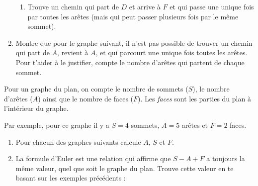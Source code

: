 \documentclass[class=report,crop=false, 12pt]{standalone}
\begin{document}
\begin{activite}
\begin{enumerate}
\begin{enumerate}
    \item Trouve un chemin qui part de $D$ et arrive à $F$ et qui passe une unique fois par toutes les arêtes (mais qui peut passer plusieurs fois par le même sommet).  
  \end{enumerate} 
  

 
 
  \item Montre que pour le graphe suivant, il n'est pas possible de trouver un chemin qui part de $A$, revient à $A$, et qui parcourt une unique fois toutes les arêtes. Pour t'aider à le justifier, compte le nombre d'arêtes qui partent de chaque sommet.


\end{enumerate}
      
   
\end{activite}


\begin{activite}
Pour un graphe du plan, on compte le nombre de sommets ($S$), le nombre d'arêtes ($A$) ainsi que le nombre de faces ($F$). Les \emph{faces} sont les parties du plan à l'intérieur du graphe.

Par exemple, pour ce graphe il y a $S=4$ sommets, $A=5$ arêtes et $F=2$ faces.


    

 
\begin{enumerate}
  \item	Pour chacun des graphes suivants calcule $A$, $S$ et $F$.
      
  
  \item La formule d'Euler est une relation qui affirme que $S-A+F$ a toujours la même valeur, quel que soit le graphe du plan. Trouve cette valeur en te basant sur les exemples précédents :
  
 {\large 
} 
\end{enumerate}
    

\end{activite}
\end{document}
